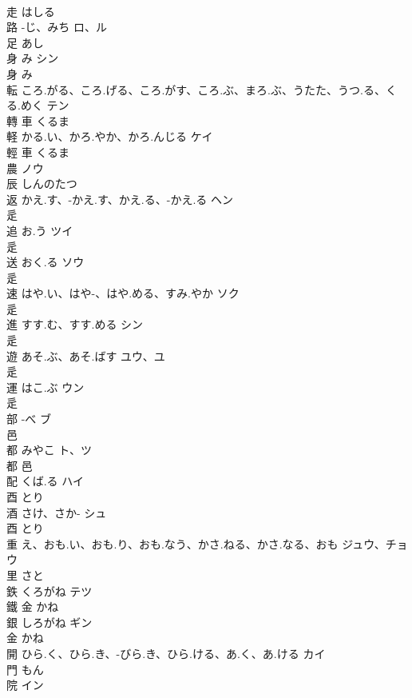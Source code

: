 \documentclass[8pt]{extreport}
\begin{document}
\begin{CJK}{UTF8}{min}
\\	走		はしる		
\\	路	-じ、みち	ロ、ル	
\\	足		あし		
\\	身	み	シン	
\\	身		み		
\\	転	ころ.がる、ころ.げる、ころ.がす、ころ.ぶ、まろ.ぶ、うたた、うつ.る、くる.めく	テン	
\\	轉	車		くるま		
\\	軽	かる.い、かろ.やか、かろ.んじる	ケイ	
\\	輕	車		くるま		
\\	農		ノウ	
\\	辰		しんのたつ		
\\	返	かえ.す、-かえ.す、かえ.る、-かえ.る	ヘン	
\\	辵				
\\	追	お.う	ツイ	
\\	辵				
\\	送	おく.る	ソウ	
\\	辵				
\\	速	はや.い、はや-、はや.める、すみ.やか	ソク	
\\	辵				
\\	進	すす.む、すす.める	シン	
\\	辵				
\\	遊	あそ.ぶ、あそ.ばす	ユウ、ユ	
\\	辵				
\\	運	はこ.ぶ	ウン	
\\	辵				
\\	部	-べ	ブ	
\\	邑				
\\	都	みやこ	ト、ツ	
\\	都	邑				
\\	配	くば.る	ハイ	
\\	酉		とり		
\\	酒	さけ、さか-	シュ	
\\	酉		とり		
\\	重	え、おも.い、おも.り、おも.なう、かさ.ねる、かさ.なる、おも	ジュウ、チョウ	
\\	里		さと		
\\	鉄	くろがね	テツ	
\\	鐵	金		かね		
\\	銀	しろがね	ギン	
\\	金		かね		
\\	開	ひら.く、ひら.き、-びら.き、ひら.ける、あ.く、あ.ける	カイ	
\\	門		もん		
\\	院		イン	

\end{CJK}
\end{document}
